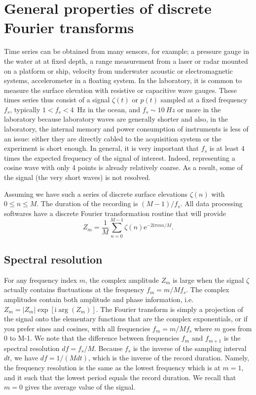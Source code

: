 \section{General properties of discrete Fourier transforms}
 Time series can be obtained from many sensors, for example; a pressure gauge in the water at at fixed depth, a range measurement from a laser or radar mounted on 
 a platform or ship, velocity from 
  underwater acoustic or electromagnetic systems, accelerometer in a floating system.  In the laboratory, it is common to measure 
  the surface elevation with resistive or capacitive wave gauges.  These times series thus consist of a signal $\zeta(t)$ or $p(t)$ sampled 
  at a fixed frequency  $f_s$, typically $1<f_s< 4$~Hz in the ocean,
and $f_s \sim  10~Hz$ or more in the laboratory because laboratory waves are generally  shorter and also, in the laboratory,  the internal memory and 
power consumption of instruments is less of an issue: either they are directly cabled to the acquisition system or the experiment is short enough.  
In general, it is very important that $f_s$ is at least 4 times the expected frequency of the signal of interest. Indeed, 
representing a cosine wave with only 4 points is already relatively coarse. As a result, some of the signal (the very short waves) is not resolved. 


Assuming we have such a series of discrete surface elevations
$\zeta(n)$ with $0\leq n\le M$. The duration of the recording is 
$(M-1)/f_s$. All data processing softwares have a discrete Fourier transformation routine that will provide 
\begin{equation}
    Z_m= \frac{1}{M}\sum_{n=0}^{M-1} \zeta(n)  \mathrm{e}^{-2\mathrm{i}\pi
    m  n/M}.\label{eq:Zm_def}
\end{equation}
\subsection{Spectral resolution}
For any frequency index $m$, the complex amplitude $Z_m$ is large when the signal $\zeta$ actually contains fluctuations at the frequency $f_m =m/M f_s$. The complex amplitudes contain both amplitude and phase information, i.e. $Z_m=|Z_m| \exp[\mathrm{i} \arg({Z_m})]$. The Fourier transform is simply a projection of the signal onto the elementary functions that are the complex exponentials, or if you prefer sines and cosines, with all frequencies $f_m =m/M f_s$ where $m$ goes from 0 to M-1. We note that the difference between frequencies $f_m$ and $f_{m+1}$ is the spectral resolution $df = f_s / M$. Because $f_s$ is the inverse of the sampling interval $dt$, we have $df = 1/(M dt)$, which is the inverse of the record duration. Namely, the frequency resolution is the same as the lowest frequency which is at $m=1$, and it such that the lowest period equals the record duration.  We recall that $m=0$ gives the average value of the signal. 




